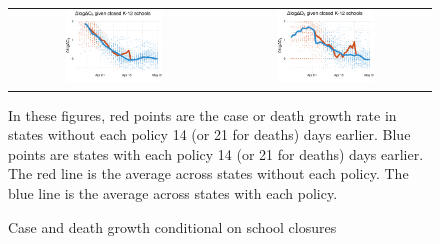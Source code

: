 \documentclass[11pt,reqno,letter]{amsart}
\theoremstyle{definition}
\begin{document}
 \begin{figure}
  \caption{Case and death growth conditional on school closures \label{fig:growthpolicies1}}
  \begin{minipage}{\linewidth}
    \centering
    \begin{tabular}{cc}
       \includegraphics[width=0.483\textwidth]{tables_and_figures/pk12-cases-14}
      &
        \includegraphics[width=0.483\textwidth]{tables_and_figures/pk12-deaths-21} 
    \end{tabular} 
      \footnotesize In these figures, red points are the case or death
      growth rate in states without each policy 14 (or 21 for deaths)
      days earlier. Blue points are states with each policy 14 (or 21
      for deaths) days earlier. The red line is the average across
      states without each policy. The blue line is the average across
      states with each policy.
  \end{minipage}
\end{figure}
\end{document}
